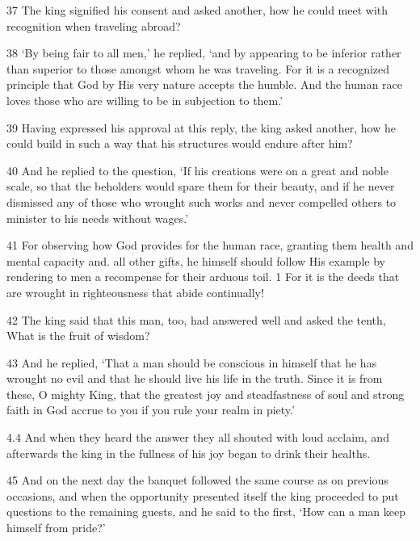 \par 37 The king signified his consent and asked another, how he could meet with recognition when traveling abroad?

\par 38 ‘By being fair to all men,’ he replied, ‘and by appearing to be inferior rather than superior to those amongst whom he was traveling. For it is a recognized principle that God by His very nature accepts the humble. And the human race loves those who are willing to be in subjection to them.’

\par 39 Having expressed his approval at this reply, the king asked another, how he could build in such a way that his structures would endure after him?

\par 40 And he replied to the question, ‘If his creations were on a great and noble scale, so that the beholders would spare them for their beauty, and if he never dismissed any of those who wrought such works and never compelled others to minister to his needs without wages.’

\par 41 For observing how God provides for the human race, granting them health and mental capacity and. all other gifts, he himself should follow His example by rendering to men a recompense for their arduous toil. 1 For it is the deeds that are wrought in righteousness that abide continually!

\par 42 The king said that this man, too, had answered well and asked the tenth, What is the fruit of wisdom?

\par 43 And he replied, ‘That a man should be conscious in himself that he has wrought no evil and that he should live his life in the truth. Since it is from these, O mighty King, that the greatest joy and steadfastness of soul and strong faith in God accrue to you if you rule your realm in piety.’

\par 4.4 And when they heard the answer they all shouted with loud acclaim, and afterwards the king in the fullness of his joy began to drink their healths.

\par 45 And on the next day the banquet followed the same course as on previous occasions, and when the opportunity presented itself the king proceeded to put questions to the remaining guests, and he said to the first, ‘How can a man keep himself from pride?’

